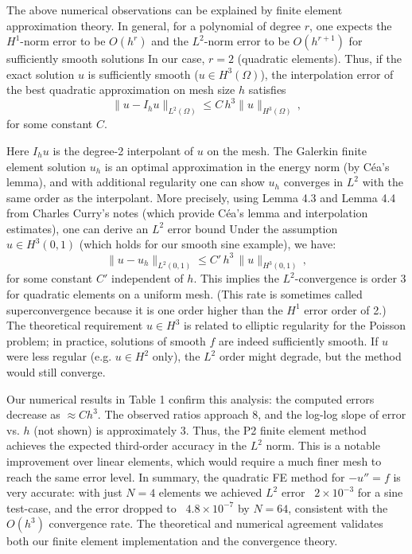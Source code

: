 \documentclass[a4paper,10pt]{article}
\begin{document}
The above numerical observations can be explained by finite element approximation theory. 
In general, for a polynomial of degree $r$, one expects the $H^1$-norm error to be $O(h^r)$ and the $L^2$-norm error to be $O(h^{r+1})$ for sufficiently smooth solutions 
In our case, $r=2$ (quadratic elements). 
Thus, if the exact solution $u$ is sufficiently smooth ($u \in H^3(\Omega)$), the interpolation error of the best quadratic approximation on mesh size $h$ satisfies
$$ \|u - I_h u\|_{L^2(\Omega)} \le C\,h^3 \|u\|_{H^3(\Omega)}\, ,$$
for some constant $C$.


Here $I_h u$ is the degree-2 interpolant of $u$ on the mesh. The Galerkin finite element solution $u_h$ is an optimal approximation in the energy norm (by Céa's lemma), and with additional regularity one can show $u_h$ converges in $L^2$ with the same order as the interpolant. 
More precisely, using Lemma 4.3 and Lemma 4.4 from Charles Curry's notes (which provide Céa's lemma and interpolation estimates), one can derive an $L^2$ error bound 
Under the assumption $u \in H^3(0,1)$ (which holds for our smooth sine example), we have:
$$ 
\|u - u_h\|_{L^2(0,1)} \le C'\,h^3\,\|u\|_{H^3(0,1)}\,, 
$$
for some constant $C'$ independent of $h$. This implies the $L^2$-convergence is order 3 for quadratic elements on a uniform mesh. 
(This rate is sometimes called superconvergence because it is one order higher than the $H^1$ error order of 2.) 
The theoretical requirement $u\in H^3$ is related to elliptic regularity for the Poisson problem; in practice, solutions of smooth $f$ are indeed sufficiently smooth. 
If $u$ were less regular (e.g. $u\in H^2$ only), the $L^2$ order might degrade, but the method would still converge.

Our numerical results in Table 1 confirm this analysis: the computed errors decrease as $\approx C h^3$. The observed ratios approach 8, and the log-log slope of error vs. $h$ (not shown) is approximately 3. Thus, the P2 finite element method achieves the expected third-order accuracy in the $L^2$ norm. This is a notable improvement over linear elements, which would require a much finer mesh to reach the same error level. In summary, the quadratic FE method for $-u''=f$ is very accurate: with just $N=4$ elements we achieved $L^2$ error ~$2\times10^{-3}$ for a sine test-case, and the error dropped to ~$4.8\times10^{-7}$ by $N=64$, consistent with the $O(h^3)$ convergence rate. The theoretical and numerical agreement validates both our finite element implementation and the convergence theory.
\end{document}

